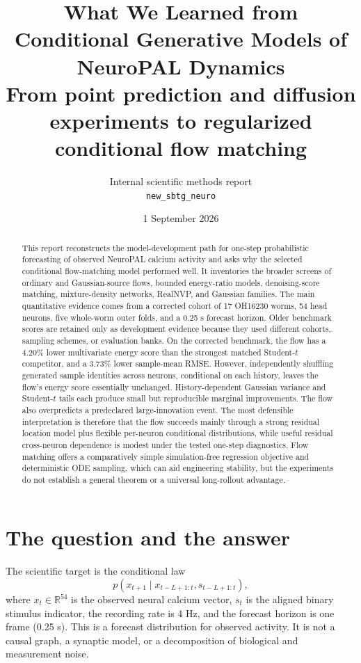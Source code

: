 \documentclass[11pt]{article}
\title{\textbf{What We Learned from Conditional Generative Models of NeuroPAL Dynamics}\\[0.35em]
\large From point prediction and diffusion experiments to regularized conditional flow matching}
\author{Internal scientific methods report\\\texttt{new\_sbtg\_neuro}}
\date{1 September 2026}
\newcommand{\R}{\mathbb{R}}
\begin{document}
\maketitle

\begin{abstract}
This report reconstructs the model-development path for one-step probabilistic forecasting of observed NeuroPAL calcium activity and asks why the selected conditional flow-matching model performed well. It inventories the broader screens of ordinary and Gaussian-source flows, bounded energy-ratio models, denoising-score matching, mixture-density networks, RealNVP, and Gaussian families. The main quantitative evidence comes from a corrected cohort of 17 OH16230 worms, 54 head neurons, five whole-worm outer folds, and a 0.25 s forecast horizon. Older benchmark scores are retained only as development evidence because they used different cohorts, sampling schemes, or evaluation banks. On the corrected benchmark, the flow has a 4.20\% lower multivariate energy score than the strongest matched Student-$t$ competitor, and a 3.73\% lower sample-mean RMSE. However, independently shuffling generated sample identities across neurons, conditional on each history, leaves the flow's energy score essentially unchanged. History-dependent Gaussian variance and Student-$t$ tails each produce small but reproducible marginal improvements. The flow also overpredicts a predeclared large-innovation event. The most defensible interpretation is therefore that the flow succeeds mainly through a strong residual location model plus flexible per-neuron conditional distributions, while useful residual cross-neuron dependence is modest under the tested one-step diagnostics. Flow matching offers a comparatively simple simulation-free regression objective and deterministic ODE sampling, which can aid engineering stability, but the experiments do not establish a general theorem or a universal long-rollout advantage.
\end{abstract}

\tableofcontents
\clearpage

\section{The question and the answer}

The scientific target is the conditional law
\begin{equation}
 p\!\left(x_{t+1}\mid x_{t-L+1:t},s_{t-L+1:t}\right),
 \label{eq:estimand}
\end{equation}
where $x_t\in\R^{54}$ is the observed neural calcium vector, $s_t$ is the aligned binary stimulus indicator, the recording rate is 4 Hz, and the forecast horizon is one frame (0.25 s). This is a forecast distribution for observed activity. It is not a causal graph, a synaptic model, or a decomposition of biological and measurement noise.
\end{document}
